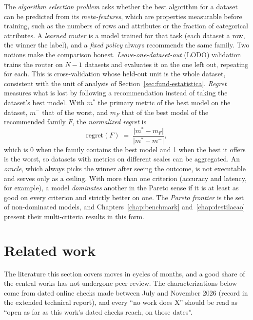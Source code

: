 The \emph{algorithm selection problem} \citep{rice1976} asks whether
the best algorithm for a dataset can be predicted from its
\emph{meta-features}, which are properties measurable before training, such as the numbers of rows and attributes
or the fraction of categorical attributes. A \emph{learned router} is
a model trained for that task (each dataset a row, the winner the label), and a \emph{fixed policy} always recommends the same
family. Two notions make the comparison honest. \emph{Leave-one-dataset-out} (LODO) validation trains the
router on $N-1$ datasets and evaluates it on the one left out,
repeating for each. This is cross-validation whose held-out
unit is the whole dataset, consistent with the unit of analysis of
Section~\ref{sec:fund-estatistica}. \emph{Regret} measures what is lost by following a recommendation instead of
taking the dataset's best model. With $m^{*}$ the primary metric of
the best model on the dataset, $m^{-}$ that of the worst, and $m_{F}$
that of the best model of the recommended family $F$, the \emph{normalized regret} is
\begin{equation}
\mathrm{regret}(F) \;=\;
\frac{\lvert m^{*} - m_{F} \rvert}{\lvert m^{*} - m^{-} \rvert},
\label{eq:fund-regret}
\end{equation}
which is 0 when the family contains the best model and 1 when the
best it offers is the worst, so datasets with metrics on different scales can be aggregated. An \emph{oracle}, which
always picks the winner after seeing the outcome, is not executable
and serves only as a ceiling. With more than one criterion (accuracy and latency, for example), a model \emph{dominates} another
in the Pareto sense if it is at least as good on every criterion
and strictly better on one. The \emph{Pareto frontier} is the set of
non-dominated models, and Chapters~\ref{chap:benchmark}
and~\ref{chap:destilacao} present their multi-criteria results in
this form.

\section{Related work}
\label{chap:related}

The literature this section covers moves in cycles of months, and
a good share of the central works has not undergone peer review. The
characterizations below come from dated online checks made between
July and November 2026 (record in the extended technical report), and every ``no work does X'' should be read as ``open as far as this work's dated checks reach, on those dates''.

